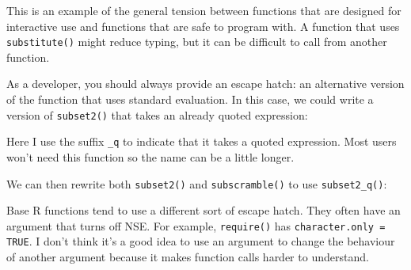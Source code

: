 This is an example of the general tension between functions that are
designed for interactive use and functions that are safe to program
with. A function that uses \texttt{substitute()} might reduce typing,
but it can be difficult to call from another function.

As a developer, you should always provide an escape hatch: an
alternative version of the function that uses standard evaluation. In
this case, we could write a version of \texttt{subset2()} that takes an
already quoted expression:

\begin{Shaded}
\begin{Highlighting}[]
\StringTok{ }
  \StringTok{ }\NormalTok{())}
\NormalTok{\}}
\end{Highlighting}
\end{Shaded}

Here I use the suffix \texttt{\_q} to indicate that it takes a quoted
expression. Most users won't need this function so the name can be a
little longer.

We can then rewrite both \texttt{subset2()} and \texttt{subscramble()}
to use \texttt{subset2\_q()}:

\begin{Shaded}
\begin{Highlighting}[]
\StringTok{ }
\NormalTok{\}}

\StringTok{ }
  \StringTok{ }
  \NormalTok{(}
\NormalTok{\}}

\StringTok{ }\NormalTok{)}
\StringTok{ }\NormalTok{)}
\end{Highlighting}
\end{Shaded}

Base R functions tend to use a different sort of escape hatch. They
often have an argument that turns off NSE. For example,
\texttt{require()} has \texttt{character.only = TRUE}. I don't think
it's a good idea to use an argument to change the behaviour of another
argument because it makes function calls harder to understand.

